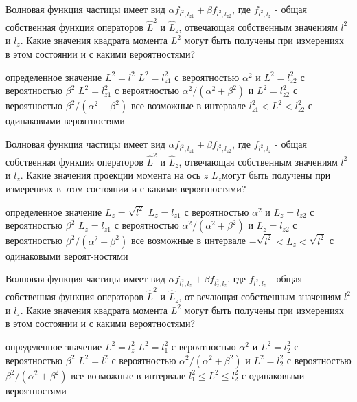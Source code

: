 \documentclass[11pt,a4paper]{exam}
\begin{document}
\begin{questions}
\question Волновая функция частицы имеет вид $\alpha {f_{{l^2},{l_{z1}}}} + \beta {f_{{l^2},{l_{z2}}}}$, где ${f_{{l^2},{l_z}}}$ - общая собственная функция операторов ${\hat L^2}$ и ${\hat L_z}$, отвечающая собственным значениям ${l^2}$ и ${l_z}$. Какие значения квадрата момента ${L^2}$ могут быть получены при измерениях в этом состоянии и с какими вероятностями?
\begin{choices}
\choice определенное значение ${L^2} = {l^2}$
\choice ${L^2} = l_{z1}^2$ с вероятностью ${\alpha ^2}$ и ${L^2} = l_{z2}^2$ с вероятностью ${\beta ^2}$ 
\choice ${L^2} = l_{z1}^2$ с вероятностью ${\alpha ^2}/({\alpha ^2} + {\beta ^2})$ и ${L^2} = l_{z2}^2$ с вероятностью ${\beta ^2}/({\alpha ^2} + {\beta ^2})$
\choice все возможные в интервале $l_{z1}^2 < {L^2} < l_{z2}^2$ с одинаковыми вероятностями
\end{choices}

\question Волновая функция частицы имеет вид $\alpha {f_{{l^2},{l_{z1}}}} + \beta {f_{{l^2},{l_{z2}}}}$, где ${f_{{l^2},{l_z}}}$ - общая собственная функция операторов ${\hat L^2}$ и ${\hat L_z}$, отвечающая собственным значениям ${l^2}$ и ${l_z}$. Какие значения проекции момента на ось $z$ ${L_z}$могут быть получены при измерениях в этом состоянии и с какими вероятностями?
\begin{choices}
\choice определенное значение ${L_z} = \sqrt {{l^2}} $
\choice ${L_z} = l_{z1}^{}$ с вероятностью ${\alpha ^2}$ и ${L_z} = l_{z2}^{}$ с вероятностью ${\beta ^2}$
\choice ${L_z} = l_{z1}^{}$ с вероятностью ${\alpha ^2}/({\alpha ^2} + {\beta ^2})$ и ${L_z} = l_{z2}^{}$ с вероятностью ${\beta ^2}/({\alpha ^2} + {\beta ^2})$
\choice все возможные в интервале $ - \sqrt {{l^2}}  < {L_z} < \sqrt {{l^2}} $ с одинаковыми вероят-ностями
\end{choices}

\question Волновая функция частицы имеет вид $\alpha {f_{l_1^2,{l_z}}} + \beta {f_{l_2^2,{l_z}}}$, где ${f_{{l^2},{l_z}}}$ - общая собственная функция операторов ${\hat L^2}$ и ${\hat L_z}$, от-вечающая собственным значениям ${l^2}$ и ${l_z}$. Какие значения квадрата момента ${L^2}$ могут быть получены при измерениях в этом состоянии и с какими вероятностями?
\begin{choices}
\choice определенное значение ${L^2} = l_z^2$
\choice ${L^2} = l_1^2$ с вероятностью ${\alpha ^2}$ и ${L^2} = l_2^2$ с вероятностью ${\beta ^2}$
\choice ${L^2} = l_1^2$ с вероятностью ${\alpha ^2}/({\alpha ^2} + {\beta ^2})$ и ${L^2} = l_2^2$ с вероятностью ${\beta ^2}/({\alpha ^2} + {\beta ^2})$
\choice все возможные в интервале $l_1^2 \le {L^2} \le l_2^2$ с одинаковыми вероятностями
\end{choices}


\end{questions}
\end{document}

